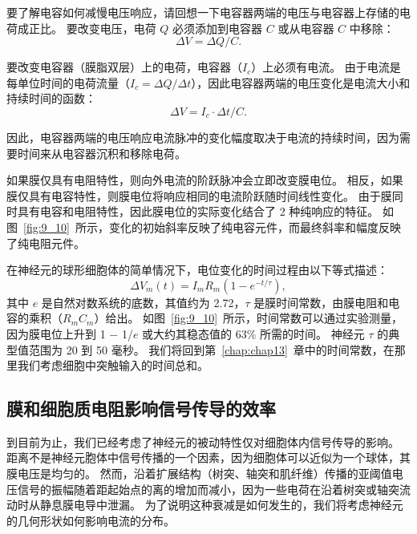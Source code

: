 要了解电容如何减慢电压响应，请回想一下电容器两端的电压与电容器上存储的电荷成正比。 
要改变电压，电荷 $Q$ 必须添加到电容器 $C$ 或从电容器 $C$ 中移除：
\begin{equation}
	\Delta V = \Delta Q/C.
\end{equation}


要改变电容器（膜脂双层）上的电荷，电容器（$I_c$）上必须有电流。
由于电流是每单位时间的电荷流量（$I_c = \Delta Q/ \Delta t $），因此电容器两端的电压变化是电流大小和持续时间的函数：
\begin{equation}
	\Delta V = I_c \cdot \Delta t / C.
\end{equation}


因此，电容器两端的电压响应电流脉冲的变化幅度取决于电流的持续时间，因为需要时间来从电容器沉积和移除电荷。


如果膜仅具有电阻特性，则向外电流的阶跃脉冲会立即改变膜电位。
相反，如果膜仅具有电容特性，则膜电位将响应相同的电流阶跃随时间线性变化。
由于膜同时具有电容和电阻特性，因此膜电位的实际变化结合了 2 种纯响应的特征。
如图~\ref{fig:9_10}~所示，变化的初始斜率反映了纯电容元件，而最终斜率和幅度反映了纯电阻元件。


在神经元的球形细胞体的简单情况下，电位变化的时间过程由以下等式描述：
\begin{equation}
	\Delta V_m (t) = I_m R_m (1 - e^{-t/\tau}),
\end{equation}
其中 $e$ 是自然对数系统的底数，其值约为 2.72，$\tau$ 是膜时间常数，由膜电阻和电容的乘积（$R_m C_m$）给出。
如图~\ref{fig:9_10}~所示，时间常数可以通过实验测量，因为膜电位上升到 1 − 1/$e$ 或大约其稳态值的 63\% 所需的时间。 
神经元 $\tau$ 的典型值范围为 20 到 50 毫秒。
我们将回到第~\ref{chap:chap13}~章中的时间常数，在那里我们考虑细胞中突触输入的时间总和。



\subsection{膜和细胞质电阻影响信号传导的效率}

到目前为止，我们已经考虑了神经元的被动特性仅对细胞体内信号传导的影响。
距离不是神经元胞体中信号传播的一个因素，因为细胞体可以近似为一个球体，其膜电压是均匀的。
然而，沿着扩展结构（树突、轴突和肌纤维）传播的亚阈值电压信号的振幅随着距起始点的离的增加而减小，因为一些电荷在沿着树突或轴突流动时从静息膜电导中泄漏。
为了说明这种衰减是如何发生的，我们将考虑神经元的几何形状如何影响电流的分布。


